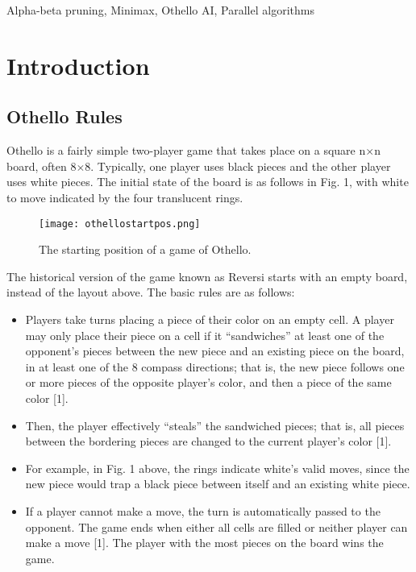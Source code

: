 \documentclass[conference]{IEEEtran}
\begin{document}
\begin{IEEEkeywords}
Alpha-beta pruning, Minimax, Othello AI, Parallel algorithms
\end{IEEEkeywords}

\section{Introduction}
\subsection{Othello Rules}
Othello is a fairly simple two-player game that takes place on a square n$\times$n board, often 8$\times$8. Typically, one player uses black pieces and the other player uses white pieces. The initial state of the board is as follows in Fig. 1, with white to move indicated by the four translucent rings.

\begin{figure}[htbp]
\centerline{\texttt{[image: othellostartpos.png]}}
\caption{The starting position of a game of Othello.}
\label{fig}
\end{figure}


The historical version of the game known as Reversi starts with an empty board, instead of the layout above. The basic rules are as follows:
\begin{itemize}
\item Players take turns placing a piece of their color on an empty cell. A player may only place their piece on a cell if it “sandwiches” at least one of the opponent’s pieces between the new piece and an existing piece on the board, in at least one of the 8 compass directions; that is, the new piece follows one or more pieces of the opposite player’s color, and then a piece of the same color [1]. 
\item Then, the player effectively “steals” the sandwiched pieces; that is, all pieces between the bordering pieces are changed to the current player’s color [1]. 
\item For example, in Fig. 1 above, the rings indicate white’s valid moves, since the new piece would trap a black piece between itself and an existing white piece.
\item If a player cannot make a move, the turn is automatically passed to the opponent.
The game ends when either all cells are filled or neither player can make a move [1]. The player with the most pieces on the board wins the game.
\end{itemize}
\end{document}
